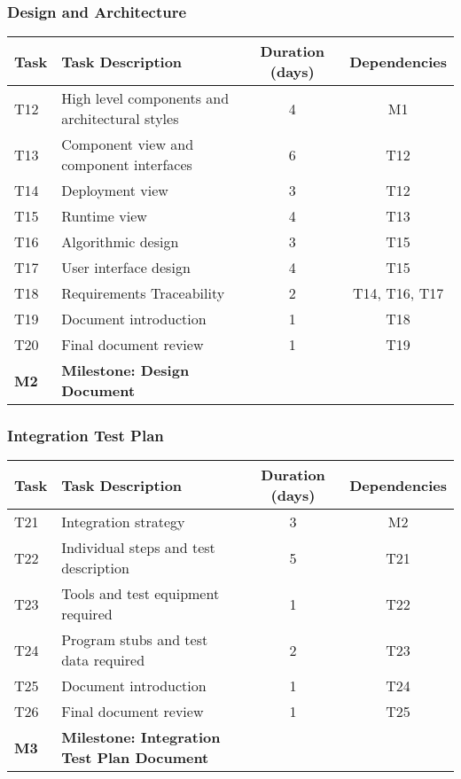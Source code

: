 \subsubsection{Design and Architecture}
\begin{tabular}{| l | p{7cm}  | c |  c |}
\hline
\textbf{Task} & \textbf{Task Description} & \textbf{Duration (days)} & \textbf{Dependencies}\\
\hline
T12 & High level components and architectural styles & 4 & M1\\
\hline
T13 & Component view and component interfaces & 6 & T12\\
\hline
T14 & Deployment view & 3 & T12\\
\hline
T15 & Runtime view & 4 & T13\\
\hline
T16 & Algorithmic design & 3 & T15\\
\hline
T17 & User interface design & 4 & T15\\
\hline
T18 & Requirements Traceability & 2 & T14, T16, T17\\
\hline
T19 & Document introduction & 1 & T18\\
\hline
T20 & Final document review & 1 & T19\\
\hline
\textbf{M2} & \textbf{Milestone: Design Document} &  & \\
\hline
\end{tabular}

\subsubsection{Integration Test Plan}
\begin{tabular}{| l | p{7cm}  | c |  c |}
\hline
\textbf{Task} & \textbf{Task Description} & \textbf{Duration (days)} & \textbf{Dependencies}\\
\hline
T21 & Integration strategy & 3 & M2\\
\hline
T22 & Individual steps and test description & 5 & T21\\
\hline
T23 & Tools and test equipment required & 1 & T22\\
\hline
T24 & Program stubs and test data required & 2 & T23\\
\hline
T25 & Document introduction & 1 & T24\\
\hline
T26 & Final document review & 1 & T25\\
\hline
\textbf{M3} & \textbf{Milestone: Integration Test Plan Document} &  & \\
\hline
\end{tabular}

